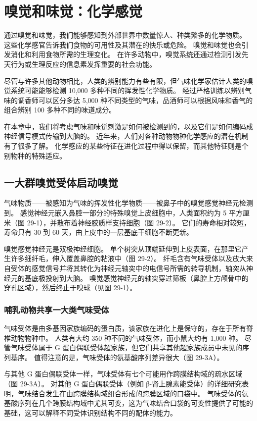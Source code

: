 \chapter{嗅觉和味觉：化学感觉} \label{chap:chap29}
通过嗅觉和味觉，我们能够感知到外部世界中数量惊人、种类繁多的化学物质。 这些化学感官告诉我们食物的可用性及其潜在的快乐或危险。 嗅觉和味觉也会引发消化和利用食物所需的生理变化。 在许多动物中，嗅觉系统还通过检测引发先天行为或生理反应的信息素发挥重要的社会功能。

尽管与许多其他动物相比，人类的辨别能力有些有限，但气味化学家估计人类的嗅觉系统可能能够检测 10,000 多种不同的挥发性化学物质。 经过严格训练以辨别气味的调香师可以区分多达 5,000 种不同类型的气味，品酒师可以根据风味和香气的组合辨别 100 多种不同的味道成分。

在本章中，我们将考虑气味和味觉刺激是如何被检测到的，以及它们是如何编码成神经信号模式传输到大脑的。 近年来，人们对各种动物物种化学感应的潜在机制有了很多了解。 化学感应的某些特征在进化过程中得以保留，而其他特征则是个别物种的特殊适应。

\section{一大群嗅觉受体启动嗅觉}
气味物质——被感知为气味的挥发性化学物质——被鼻子中的嗅觉感觉神经元检测到。 感觉神经元嵌入鼻腔一部分的特殊嗅觉上皮细胞中，人类面积约为 5 平方厘米（图 29-1），并散布着神经胶质样支持细胞（图 29-2）。 它们的寿命相对较短，寿命只有 30 到 60 天，由上皮中的一层基底干细胞不断更新。

嗅觉感觉神经元是双极神经细胞。 单个树突从顶端延伸到上皮表面，在那里它产生许多细纤毛，伸入覆盖鼻腔的粘液中（图 29-2）。 纤毛含有气味受体以及放大来自受体的感觉信号并将其转化为神经元轴突中的电信号所需的转导机制，轴突从神经元的基底极投射到大脑。 嗅觉感觉神经元的轴突穿过筛板（鼻腔上方颅骨中的穿孔区域），然后终止于嗅球（见图 29-1）。

\subsection{哺乳动物共享一大类气味受体}
气味受体是由多基因家族编码的蛋白质，该家族在进化上是保守的，存在于所有脊椎动物物种中。 人类有大约 350 种不同的气味受体，而小鼠大约有 1,000 种。 尽管气味受体属于 G 蛋白偶联受体超家族，但它们共享其他超家族成员中未见的序列基序。 值得注意的是，气味受体的氨基酸序列差异很大（图 29-3A）。

与其他 G 蛋白偶联受体一样，气味受体有七个可能用作跨膜结构域的疏水区域（图 29-3A）。 对其他 G 蛋白偶联受体（例如 β-肾上腺素能受体）的详细研究表明，气味结合发生在由跨膜结构域组合形成的跨膜区域的口袋中。 气味受体的氨基酸序列在几个跨膜结构域中尤其可变，这为气味结合口袋的可变性提供了可能的基础，这可以解释不同受体识别结构不同的配体的能力。

